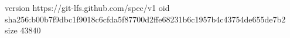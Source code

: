 version https://git-lfs.github.com/spec/v1
oid sha256:b00b7f9dbc1f9018c6cfda5f87700d2ffe68231b6c1957b4c43754de655de7b2
size 43840
